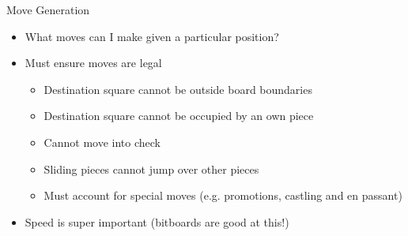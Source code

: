 \documentclass[xcolor=pdftex,dvipsnames,table]{beamer}
\begin{document}

\begin{frame}{Move Generation}
\begin{itemize}
\item What moves can I make given a particular position?
\item Must ensure moves are legal
	\begin{itemize}
    \item[\textbullet] Destination square cannot be outside board boundaries
    \item[\textbullet] Destination square cannot be occupied by an own piece
    \item[\textbullet] Cannot move into check
    \item[\textbullet] Sliding pieces cannot jump over other pieces
    \item[\textbullet] Must account for special moves (e.g. promotions, castling and en passant)
    \end{itemize}
\item Speed is super important (bitboards are good at this!)
\end{itemize}
\end{frame}

\end{document}
